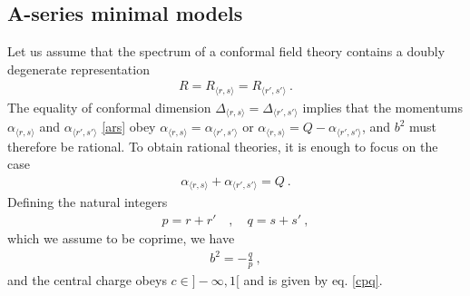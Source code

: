 \documentclass[12pt,a4paper,notitlepage]{report}
\numberwithin{equation}{section}
\theoremstyle{break}
\begin{document}
\subsection{A-series minimal models \label{secamm}}

Let us assume that the spectrum of a conformal field theory contains a doubly degenerate representation 
\begin{align}
 R=R_{\langle r,s \rangle}=R_{\langle r',s' \rangle}\ .
\end{align}
The equality of conformal dimension $\Delta_{\langle r,s \rangle}=\Delta_{\langle r',s' \rangle}$ implies that 
the momentums $\alpha_{\langle r,s \rangle}$ and $\alpha_{\langle r',s' \rangle}$ \eqref{ars} obey $\alpha_{\langle r,s \rangle}=\alpha_{\langle r',s' \rangle}$ or $\alpha_{\langle r,s \rangle}=Q-\alpha_{\langle r',s' \rangle}$, and $b^2$ must therefore be rational.
To obtain rational theories, it is enough to focus on the case 
\begin{align}
 \alpha_{\langle r,s \rangle}+\alpha_{\langle r',s' \rangle} = Q\ .
\end{align}
Defining the natural integers 
\begin{align}
 p = r+r' \quad , \quad q = s+s'\ ,
\end{align}
which we assume to be coprime, we have 
\begin{align} 
 \boxed{b^2 = - \frac{q}{p}} \ ,
\end{align}
and the central charge obeys $c\in ]-\infty, 1[$ and is given by eq. \eqref{cpq}.
\end{document}
